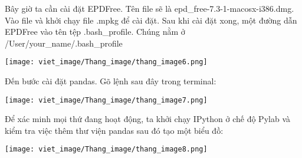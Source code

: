 \quad Bây giờ ta cần cài đặt EPDFree. Tên file sẽ là epd\_free-7.3-1-macosx-i386.dmg. Vào file và khởi chạy file .mpkg để cài đặt.
Sau khi cài đặt xong, một đường dẫn EPDFree vào tên tệp .bash\_profile. Chúng nằm ở /User/your\_name/.bash\_profile\par
\begin{center}
    \texttt{[image: viet\_image/Thang\_image/thang\_image6.png]}\par
\end{center}
\quad Đến bước cài đặt pandas. Gõ lệnh sau đây trong terminal:\par
\begin{center}
    \texttt{[image: viet\_image/Thang\_image/thang\_image7.png]}\par
\end{center}
    
Để xác minh mọi thứ đang hoạt động, ta khởi chạy IPython ở chế độ Pylab và kiểm tra việc thêm thư viện pandas sau đó tạo một biểu đồ:\par
\begin{center}
    \texttt{[image: viet\_image/Thang\_image/thang\_image8.png]}\par
\end{center}

